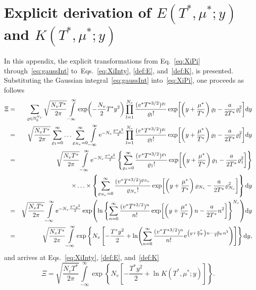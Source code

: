 \documentclass[12pt]{article}
\numberwithin{equation}{section}
\begin{document}
	\section{\label{sec:app1} Explicit derivation of $E(T^*,\mu^*;y)$ and $K(T^*,\mu^*;y)$}
	In this appendix, the explicit transformations from Eq.~\eqref{eq:XiPi} through~\eqref{eq:gaussInt} to~Eqs.~\eqref{eq:XiInty}, \eqref{def:E}, and~\eqref{def:K}, is presented. Substituting the Gaussian integral~\eqref{eq:gaussInt} into~\eqref{eq:XiPi}, one proceeds as follows
	\begin{eqnarray}
		\Xi 
		&=& 
		\sum_{\varrho \in \mathbb{N}_0^{N_v}} \sqrt{\frac{N_v T^*}{2\pi}} \int\limits_{-\infty}^{\infty} \exp(-\frac{N_v}{2} T^* y^2) 
		\prod\limits_{l=1}^{N_v} \frac{(v^* T^{*3/2})^{\varrho_l}}{\varrho_l !} 
		\exp[\left(y + \frac{\mu^*}{T^*}\right) \varrho_l - \frac{a}{2T^*}\varrho_l^2] {\rm d}y
		\nonumber\\
		&=&
		\sqrt{\frac{N_v T^*}{2\pi}} \sum_{\varrho_1=0}^{\infty} \ldots \sum_{\varrho_{N_v}=0}^{\infty} 
		\int\limits_{-\infty}^{\infty} {\rm e}^{-N_v \frac{T^* y^2}{2}} 
		\prod\limits_{l=1}^{N_v} \frac{(v^* T^{*3/2})^{\varrho_l}}{\varrho_l !} 
		\exp[\left(y + \frac{\mu^*}{T^*}\right) \varrho_l - \frac{a}{2T^*}\varrho_l^2] {\rm d}y
		\nonumber\\
		&=&
		\sqrt{\frac{N_v T^*}{2\pi}} \int\limits_{-\infty}^{\infty} {\rm e}^{-N_v \frac{T^* y^2}{2}}
		\left\{ 
			\sum_{\varrho_1=0}^{\infty} \frac{(v^* T^{*3/2})^{\varrho_1}}{\varrho_1 !} \exp[\left(y + \frac{\mu^*}{T^*}\right) \varrho_1 - \frac{a}{2T^*}\varrho_1^2] 
		\right\}
		\nonumber\\
		&& 
		\times \ldots \times 
		\left\{ 
			\sum_{\varrho_{N_v}=0}^{\infty} \frac{(v^* T^{*3/2})^{\varrho_{N_v}}}{\varrho_{N_v} !} \exp[\left(y + \frac{\mu^*}{T^*}\right) \varrho_{N_v} - \frac{a}{2T^*}\varrho_{N_v}^2] 
		\right\}
		{\rm d}y
		\nonumber\\
		&=&
		\sqrt{\frac{N_v T^*}{2\pi}} \int\limits_{-\infty}^{\infty} {\rm e}^{-N_v \frac{T^* y^2}{2}}
		\exp( \ln \left\{\sum_{n=0}^{\infty} \frac{(v^* T^{*3/2})^{n}}{n!} \exp[\left(y + \frac{\mu^*}{T^*}\right)n - \frac{a}{2T^*}n^2] \right\}^{N_v} ) {\rm d}y
		\nonumber\\
		&=&
		\sqrt{\frac{N_v T^*}{2\pi}} \int\limits_{-\infty}^{\infty}
		\exp 
		\left\{ N_v 
			\left[ -\frac{T^* y^2}{2} + 
			\ln(\sum_{n=0}^{\infty} \frac{(v^* T^{*3/2})^{n}}{n!} {\rm e}^{\left(y + \frac{\mu^*}{T^*}\right)n - \frac{a}{2T^*}n^2}) 
			\right] 
		\right\} {\rm d}y,
	\end{eqnarray}
	and arrives at Eqs.~\eqref{eq:XiInty}, \eqref{def:E}, and~\eqref{def:K}
	\begin{equation}
		\Xi = \sqrt{\frac{N_v T^*}{2\pi}} \int\limits_{-\infty}^{\infty}
		\exp 
		\left\{ N_v 
		\left[ -\frac{T^* y^2}{2} + 
		\ln K(T^*,\mu^*;y) 
		\right] 
		\right\}.
	\end{equation}
	
\end{document}
